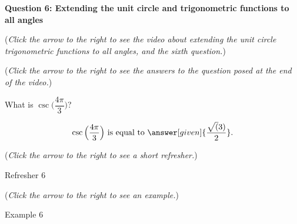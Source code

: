 \documentclass{ximera}
\begin{document}
\textbf{Question 6: Extending the unit circle and trigonometric
functions to all angles}
\begin{question}
\begin{flushright}
{\color{blue}(\emph{Click the arrow to the right to see
the video about extending the unit circle trigonometric
functions to all angles, and the sixth question.})}
\end{flushright}
\begin{center}
\begin{expandable}
{\color{blue}(\emph{Click the arrow to the right to see the answers 
to the question posed at the end of the video.})}
\begin{expandable}
What is $\csc\Big(\dfrac{4\pi}{3}\Big)$?
\begin{prompt}
\[
\csc\Big( \dfrac{4\pi}{3}\Big) \text{ is equal to } \answer[given]{\frac{\sqrt(3)}{2}}.
\]
\end{prompt}
\begin{flushright}
{\color{blue}(\emph{Click the arrow to the right to see a short refresher.})}
\end{flushright}
\begin{expandable}
Refresher 6
\end{expandable}
\begin{flushright}
{\color{blue}(\emph{Click the arrow to the right to see an example.})}
\end{flushright}
\begin{expandable}
Example 6
\end{expandable}
\end{expandable}
\end{expandable}
\end{center}
\end{question}
\end{document}
